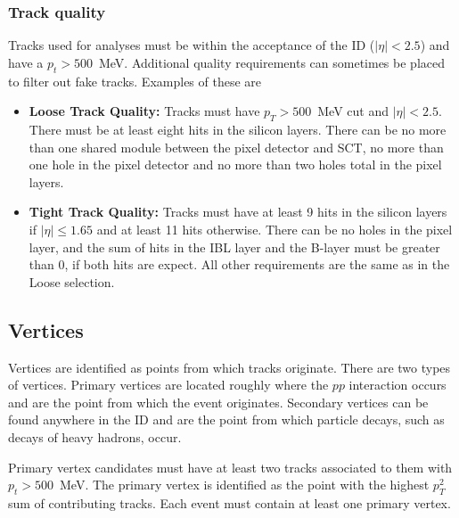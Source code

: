\documentclass[10pt,a4paper]{book}
\begin{document}
\subsubsection{Track quality}
Tracks used for analyses must be within the acceptance of the ID ($\vert \eta \vert < 2.5$) and have a $p_t > 500$~MeV. Additional quality requirements can sometimes be placed to filter out fake tracks. Examples of these are
\begin{itemize}
    \item \textbf{Loose Track Quality:} Tracks must have $p_T > 500$~MeV cut and $\vert \eta \vert < 2.5$. There must be at least eight hits in the silicon layers. There can be no more than one shared module between the pixel detector and SCT, no more than one hole in the pixel detector and no more than two holes total in the pixel layers.
    \item \textbf{Tight Track Quality:} Tracks must have at least 9 hits in the silicon layers if $\vert \eta \vert \leq 1.65$ and at least 11 hits otherwise. There can be no holes in the pixel layer, and the sum of hits in the IBL layer and the B-layer must be greater than 0, if both hits are expect. All other requirements are the same as in the Loose selection.   
\end{itemize}

\subsection{Vertices}
Vertices are identified as points from which tracks originate. There are two types of vertices. Primary vertices are located roughly where the $pp$ interaction occurs and are the point from which the event originates. Secondary vertices can be found anywhere in the ID and are the point from which particle decays, such as decays of heavy hadrons, occur. 

Primary vertex candidates must have at least two tracks associated to them with $p_t > 500$~MeV. The primary vertex is identified as the point with the highest $p_T^2$ sum of contributing tracks. Each event must contain at least one primary vertex.
\end{document}
